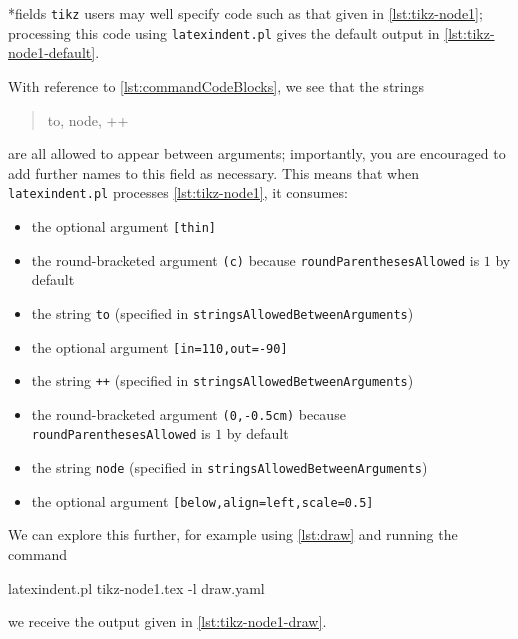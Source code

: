 *{fields}
 \texttt{tikz} users may well specify code such as that given in
 \cref{lst:tikz-node1}; processing this code using
 \texttt{latexindent.pl} gives the default output in \cref{lst:tikz-node1-default}.

 \begin{minipage}{.45\textwidth}
 \end{minipage}
 \hfill
 \begin{minipage}{.45\textwidth}
 \end{minipage}

 With reference to \vref{lst:commandCodeBlocks}, we see that the strings
 \begin{quote}
  to, node, ++
 \end{quote}
 are all allowed to appear between arguments; importantly, you are encouraged to add
 further names to this field as necessary. This means that when \texttt{latexindent.pl}
 processes \cref{lst:tikz-node1}, it consumes:
 \begin{itemize}
  \item the optional argument \lstinline![thin]!
  \item the round-bracketed argument \lstinline!(c)! because \texttt{roundParenthesesAllowed} is
        $1$ by default
  \item the string \lstinline!to! (specified in \texttt{stringsAllowedBetweenArguments})
  \item the optional argument \lstinline![in=110,out=-90]!
  \item the string \lstinline!++! (specified in \texttt{stringsAllowedBetweenArguments})
  \item the round-bracketed argument \lstinline!(0,-0.5cm)! because
        \texttt{roundParenthesesAllowed} is $1$ by default
  \item the string \lstinline!node! (specified in \texttt{stringsAllowedBetweenArguments})
  \item the optional argument \lstinline![below,align=left,scale=0.5]!
 \end{itemize}

 We can explore this further, for example using \cref{lst:draw} and running the command
 \begin{commandshell}
latexindent.pl tikz-node1.tex -l draw.yaml  
\end{commandshell}
 we receive the output given in \cref{lst:tikz-node1-draw}.

